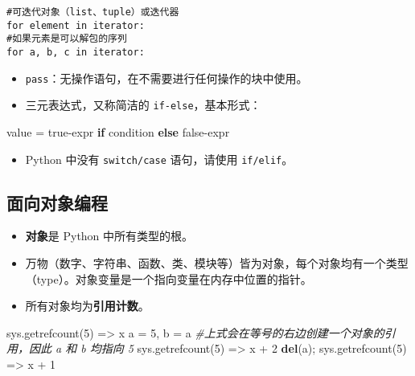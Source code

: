 \documentclass[utf-8]{ctexart}
\newenvironment{Shaded}{}{}
\newcommand{\KeywordTok}[1]{\textcolor[rgb]{0.00,0.44,0.13}{\textbf{#1}}}
\newcommand{\DecValTok}[1]{\textcolor[rgb]{0.25,0.63,0.44}{#1}}
\newcommand{\CommentTok}[1]{\textcolor[rgb]{0.38,0.63,0.69}{\textit{#1}}}
\newcommand{\ControlFlowTok}[1]{\textcolor[rgb]{0.00,0.44,0.13}{\textbf{#1}}}
\newcommand{\OperatorTok}[1]{\textcolor[rgb]{0.40,0.40,0.40}{#1}}
\newcommand{\NormalTok}[1]{#1}
\begin{document}
\begin{verbatim}
#可迭代对象（list、tuple）或迭代器
for element in iterator:
#如果元素是可以解包的序列
for a, b, c in iterator:
\end{verbatim}

\begin{itemize}
\item
  \texttt{pass}：无操作语句，在不需要进行任何操作的块中使用。
\item
  三元表达式，又称简洁的 \texttt{if-else}，基本形式：
\end{itemize}

\begin{Shaded}
\begin{Highlighting}[]
\NormalTok{value }\OperatorTok{=}\NormalTok{ true}\OperatorTok{-}\NormalTok{expr }\ControlFlowTok{if}\NormalTok{ condition }\ControlFlowTok{else}\NormalTok{ false}\OperatorTok{-}\NormalTok{expr}
\end{Highlighting}
\end{Shaded}

\begin{itemize}
\item
  Python 中没有 \texttt{switch/case} 语句，请使用 \texttt{if/elif}。
\end{itemize}

\hypertarget{header-n332}{\subsection{面向对象编程}\label{header-n332}}

\begin{itemize}
\item
  \textbf{对象}是 Python 中所有类型的根。
\item
  万物（数字、字符串、函数、类、模块等）皆为对象，每个对象均有一个类型（type）。对象变量是一个指向变量在内存中位置的指针。
\item
  所有对象均为\textbf{引用计数}。
\end{itemize}

\begin{Shaded}
\begin{Highlighting}[]
\NormalTok{sys.getrefcount(}\DecValTok{5}\NormalTok{) }\OperatorTok{=>}\NormalTok{ x}
\NormalTok{a }\OperatorTok{=} \DecValTok{5}\NormalTok{, b }\OperatorTok{=}\NormalTok{ a}
\CommentTok{#上式会在等号的右边创建一个对象的引用，因此 a 和 b 均指向 5}
\NormalTok{sys.getrefcount(}\DecValTok{5}\NormalTok{)}
\OperatorTok{=>}\NormalTok{ x }\OperatorTok{+} \DecValTok{2}
\KeywordTok{del}\NormalTok{(a)}\OperatorTok{;}\NormalTok{ sys.getrefcount(}\DecValTok{5}\NormalTok{) }\OperatorTok{=>}\NormalTok{ x }\OperatorTok{+} \DecValTok{1}
\end{Highlighting}
\end{Shaded}
\end{document}
